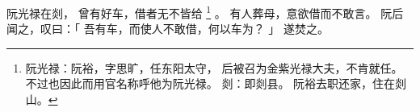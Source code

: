 
\switchcolumn*[\section{}]

阮光禄在剡，
曾有好车，借者无不皆给%
\footnote{%
    阮光禄：阮裕，字思旷，任东阳太守，
            后被召为金紫光禄大夫，不肯就任。
            不过也因此而用官名称呼他为阮光禄。
    剡：即剡县。
        阮裕去职还家，住在剡山。
}%
。
有人葬母，意欲借而不敢言。
阮后闻之，叹曰：「
    吾有车，而使人不敢借，何以车为？
」
遂焚之。

\switchcolumn


